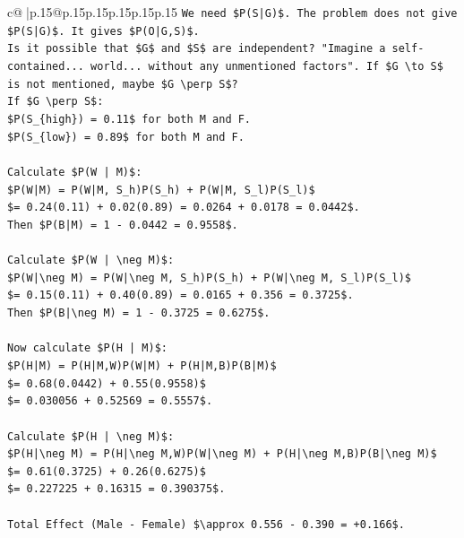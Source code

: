 \documentclass{article}
\begin{document}
{\begin{supertabular}{c@{$\;$}|p{.15\linewidth}@{}p{.15\linewidth}p{.15\linewidth}p{.15\linewidth}p{.15\linewidth}p{.15\linewidth}}
{{{\texttt{We need \$P(S|G)\$. The problem does not give \$P(S|G)\$. It gives \$P(O|G,S)\$.} \\
\texttt{Is it possible that \$G\$ and \$S\$ are independent? "Imagine a self{-}contained... world... without any unmentioned factors". If \$G \textbackslash{}to S\$ is not mentioned, maybe \$G \textbackslash{}perp S\$?} \\
\texttt{If \$G \textbackslash{}perp S\$:} \\
\texttt{\$P(S\_\{high\}) = 0.11\$ for both M and F.} \\
\texttt{\$P(S\_\{low\}) = 0.89\$ for both M and F.} \\
\\ 
\texttt{Calculate \$P(W | M)\$:} \\
\texttt{\$P(W|M) = P(W|M, S\_h)P(S\_h) + P(W|M, S\_l)P(S\_l)\$} \\
\texttt{\$= 0.24(0.11) + 0.02(0.89) = 0.0264 + 0.0178 = 0.0442\$.} \\
\texttt{Then \$P(B|M) = 1 {-} 0.0442 = 0.9558\$.} \\
\\ 
\texttt{Calculate \$P(W | \textbackslash{}neg M)\$:} \\
\texttt{\$P(W|\textbackslash{}neg M) = P(W|\textbackslash{}neg M, S\_h)P(S\_h) + P(W|\textbackslash{}neg M, S\_l)P(S\_l)\$} \\
\texttt{\$= 0.15(0.11) + 0.40(0.89) = 0.0165 + 0.356 = 0.3725\$.} \\
\texttt{Then \$P(B|\textbackslash{}neg M) = 1 {-} 0.3725 = 0.6275\$.} \\
\\ 
\texttt{Now calculate \$P(H | M)\$:} \\
\texttt{\$P(H|M) = P(H|M,W)P(W|M) + P(H|M,B)P(B|M)\$} \\
\texttt{\$= 0.68(0.0442) + 0.55(0.9558)\$} \\
\texttt{\$= 0.030056 + 0.52569 = 0.5557\$.} \\
\\ 
\texttt{Calculate \$P(H | \textbackslash{}neg M)\$:} \\
\texttt{\$P(H|\textbackslash{}neg M) = P(H|\textbackslash{}neg M,W)P(W|\textbackslash{}neg M) + P(H|\textbackslash{}neg M,B)P(B|\textbackslash{}neg M)\$} \\
\texttt{\$= 0.61(0.3725) + 0.26(0.6275)\$} \\
\texttt{\$= 0.227225 + 0.16315 = 0.390375\$.} \\
\\ 
\texttt{Total Effect (Male {-} Female) \$\textbackslash{}approx 0.556 {-} 0.390 = +0.166\$.} \\
}}}
\end{supertabular}}
\end{document}
